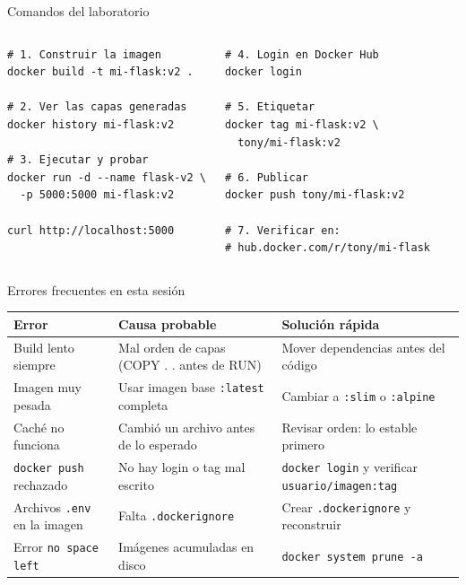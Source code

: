 \documentclass[aspectratio=169]{beamer}
\begin{document}
\begin{frame}[fragile]{Comandos del laboratorio}
  \footnotesize
  \begin{columns}[T]
\begin{lstlisting}[style=terminal]
# 1. Construir la imagen
docker build -t mi-flask:v2 .

# 2. Ver las capas generadas
docker history mi-flask:v2

# 3. Ejecutar y probar
docker run -d --name flask-v2 \
  -p 5000:5000 mi-flask:v2

curl http://localhost:5000
\end{lstlisting}
\begin{lstlisting}[style=terminal]
# 4. Login en Docker Hub
docker login

# 5. Etiquetar
docker tag mi-flask:v2 \
  tony/mi-flask:v2

# 6. Publicar
docker push tony/mi-flask:v2

# 7. Verificar en:
# hub.docker.com/r/tony/mi-flask
\end{lstlisting}
    \end{columns}
\end{frame}

\begin{frame}{Errores frecuentes en esta sesión}
  \scriptsize
  \begin{tabular}{p{} p{} p{}}
    \toprule
    Error & Causa probable & Solución rápida \\
    \midrule
    Build lento siempre & Mal orden de capas (COPY . . antes de RUN) & Mover dependencias antes del código \\
    Imagen muy pesada & Usar imagen base \texttt{:latest} completa & Cambiar a \texttt{:slim} o \texttt{:alpine} \\
    Caché no funciona & Cambió un archivo antes de lo esperado & Revisar orden: lo estable primero \\
    \texttt{docker push} rechazado & No hay login o tag mal escrito & \texttt{docker login} y verificar \texttt{usuario/imagen:tag} \\
    Archivos \texttt{.env} en la imagen & Falta \texttt{.dockerignore} & Crear \texttt{.dockerignore} y reconstruir \\
    Error \texttt{no space left} & Imágenes acumuladas en disco & \texttt{docker system prune -a} \\
    \bottomrule
  \end{tabular}
\end{frame}
\end{document}

